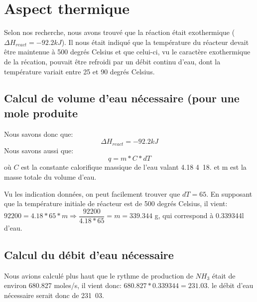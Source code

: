 \documentclass[11pt,a4paper]{report}
\begin{document}
\section{Aspect thermique}
Selon nos recherche, nous avons trouvé que la réaction était exothermique ($\Delta H_{react} = -92.2kJ$).
Il nous était indiqué que la température du réacteur devait être maintenue à 500 degrés Celsius et que celui-ci, 
vu le caractère exothermique de la récation, pouvait être refroidi par un débit continu d'eau, dont la température 
variait entre 25 et 90 degrés Celsius.

\subsection{Calcul de volume d'eau nécessaire (pour une mole produite}
Nous savons donc que: $$\Delta H_{react} = -92.2kJ$$
Nous savons aussi que:
 $$q = m*C*dT$$
où $C$ est la constante calorifique massique de l'eau valant 4.18 \unit{4.18}{\joule\per\celsius.\gram} et m est 
 la masse totale du volume d'eau.

 Vu les indication données, on peut facilement trouver que $dT=65$. En supposant que la température initiale de 
 réacteur est de 500 degrés Celsius, il vient: 
$92200 = 4.18*65*m \Rightarrow \dfrac{92200}{4.18*65} = m = 339.344$ g, qui correspond à 0.339344l d'eau.

\subsection{Calcul du débit d'eau nécessaire}

Nous avions calculé plus haut que le rythme de production de $NH_3$ était de environ 680.827 moles/s, il vient donc: 
$680.827*0.339344 = 231.03$. 
le débit d'eau nécessaire serait donc de \unit{231.03}{\liter\per\second}.
\end{document}
